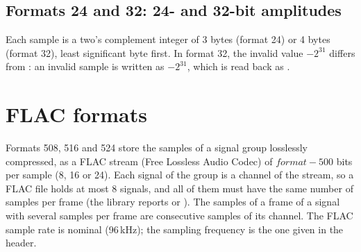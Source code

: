 \subsection{Formats 24 and 32: 24- and 32-bit amplitudes}
\label{sec:formats-24}

Each sample is a two's complement integer of 3 bytes (format 24) or 4 bytes (format 32),
least significant byte first. In format 32, the invalid value $-2^{31}$ differs from
: an invalid sample is written as $-2^{31}$, which is read back
as .

\section{FLAC formats}
\label{sec:formats-flac}

Formats 508, 516 and 524 store the samples of a signal group losslessly compressed, as a
FLAC stream (Free Lossless Audio Codec) of $\mathit{format} - 500$ bits per sample (8, 16
or 24). Each signal of the group is a channel of the stream, so a FLAC file holds at most 8
signals, and all of them must have the same number of samples per frame (the library
reports  or
). The samples of a
frame of a signal with several samples per frame are consecutive samples of its channel.
The FLAC sample rate is nominal (96\,kHz); the sampling frequency is the one given in the
header.

